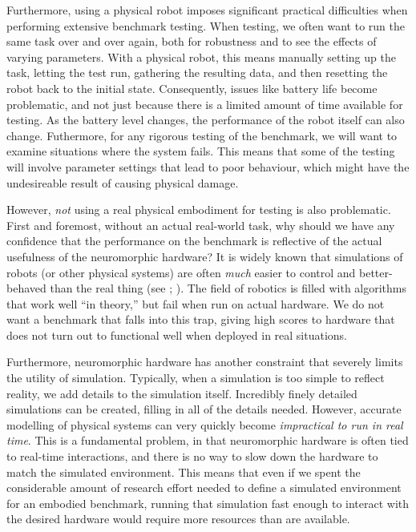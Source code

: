 \documentclass{frontiersSCNS} %
\begin{document}
Furthermore, using a physical robot imposes significant practical
difficulties when performing extensive benchmark testing.  When testing, we
often want to run the same task over and over again, both for robustness and
to see the effects of varying parameters.  With a physical robot, this means
manually setting up the task, letting the test run, gathering the resulting
data, and then resetting the robot back to the initial state.  Consequently,
issues like battery life become problematic, and not just because there is a
limited amount of time available for testing.  As the battery level changes,
the performance of the robot itself can also change.  Futhermore, for any
rigorous testing of the benchmark, we will want to examine situations where
the system fails.  This means that some of the testing will involve parameter
settings that lead to poor behaviour, which might have the undesireable 
result of causing physical damage.

However, \emph{not} using a real physical embodiment for testing is also
problematic.  First and foremost, without an actual real-world task, why
should we have any confidence that the performance on the benchmark is
reflective of the actual usefulness of the neuromorphic hardware?  It is
widely known that simulations of robots (or other physical systems) are
often \emph{much} easier to control and better-behaved than the real thing 
(see \citealt{Jakobi95}; \citealt{Koos2013}).  The
field of robotics is filled with algorithms that work well ``in theory,'' but
fail when run on actual hardware.  We do not want a benchmark that falls into
this trap, giving high scores to hardware that does not turn out to
functional well when deployed in real situations.

Furthermore, neuromorphic hardware has another constraint that severely limits
the utility of simulation.  Typically, when a simulation is
too simple to reflect reality, we add details to the simulation itself.
Incredibly finely detailed simulations can be created, filling in all of the
details needed.  However, accurate modelling of physical systems can very quickly
become \emph{impractical to run in real time}.
This is a fundamental problem, in that neuromorphic
hardware is often tied to real-time interactions, and there is no way to slow down
the hardware to match the simulated environment.  This means that even if
we spent the considerable amount of research effort needed to define a
simulated environment for an embodied benchmark, running that simulation 
fast enough to interact with the desired hardware would require more
resources than are available.  
\end{document}
